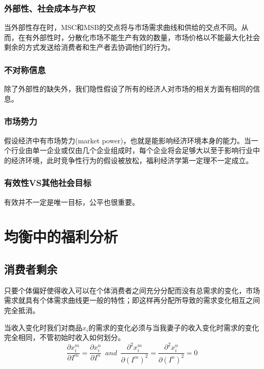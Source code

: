 \documentclass{article}
\begin{document}
\subsubsection{外部性、社会成本与产权}

当外部性存在时，MSC和MSB的交点将与市场需求曲线和供给的交点不同。从而，在有外部性时，分散化市场不能生产有效的数量，市场价格以不能最大化社会剩余的方式发送给消费者和生产者去协调他们的行为。

\subsubsection{不对称信息}

除了外部性的缺失外，我们隐性假设了所有的经济人对市场的相关方面有相同的信息。

\subsubsection{市场势力}

假设经济中有市场势力(market power)，也就是能影响经济环境本身的能力。当一个行业由单一企业或仅由几个企业组成时，每个企业将会足够大以至于影响行业中的经济环境，此时竞争性行为的假设被放松，福利经济学第一定理不一定成立。

\subsubsection{有效性VS其他社会目标}

有效并不一定是唯一目标，公平也很重要。

\section{均衡中的福利分析}

\subsection{消费者剩余}

只要个体偏好使得收入可以在个体消费者之间充分分配而没有总需求的变化，市场需求就具有个体需求曲线更一般的特性；即这样再分配所导致的需求变化相互之间完全抵消。

当收入变化时我们对商品$ x_i $的需求的变化必须与当我妻子的收入变化时需求的变化完全相同，不管初始时收入如何划分。
\[
\frac{\partial x_i^m}{\partial I^m}=\frac{\partial x_i^n}{\partial I^n}\enspace and\enspace \frac{\partial^2 x_i^m}{\partial (I^m)^2}=\frac{\partial^2 x_i^n}{\partial (I^n)^2}=0
\]
\end{document}
